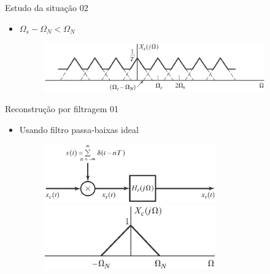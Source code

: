 \begin{slide}{Estudo da situação 02}
\begin{itemize}
   \item $\Omega_s-\Omega_N<\Omega_N$
   \begin{figure}
      \centering
      \includegraphics[width=0.9\textwidth]{figs/situacao02.eps}
   \end{figure}
\end{itemize}
\end{slide}

\begin{slide}{Reconstrução por filtragem 01}
\begin{itemize}
   \item Usando filtro passa-baixas ideal
   \begin{figure}
      \centering
      \includegraphics[width=0.7\textwidth]{figs/sistamostragem1.eps}
      \includegraphics[width=0.7\textwidth]{figs/sistamostragem2.eps}
   \end{figure}
\end{itemize}
\end{slide}

